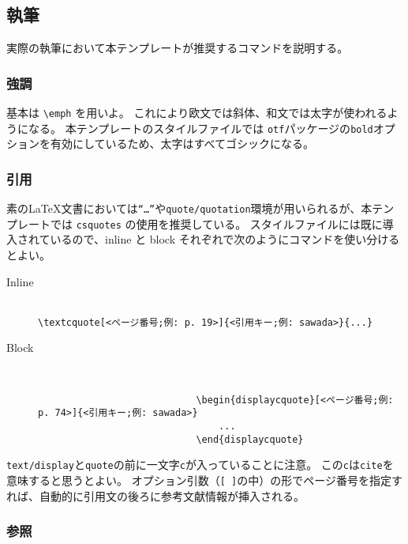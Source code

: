 		\subsection{執筆}
			\label{sub:writing}

			実際の執筆において本テンプレートが推奨するコマンドを説明する。

			\subsubsection{強調}

				基本は \texttt{\textbackslash emph} を用いよ。
				これにより欧文では斜体、和文では太字が使われるようになる。
				本テンプレートのスタイルファイルでは \texttt{otf}パッケージの\texttt{bold}オプションを有効にしているため、太字はすべてゴシックになる。

			\subsubsection{引用}

				素の\LaTeX 文書においては\texttt{``\dots''}や\texttt{quote/quotation}環境が用いられるが、本テンプレートでは \texttt{csquotes} の使用を推奨している。
				スタイルファイルには既に導入されているので、inline と block それぞれで次のようにコマンドを使い分けるとよい。

				\begin{description}
					\item[Inline] 　\\
						\verb|\textcquote[<ページ番号;例: p. 19>]{<引用キー;例: sawada>}{...}|
					\item[Block] 　
						\begin{verbatim}
							\begin{displaycquote}[<ページ番号;例: p. 74>]{<引用キー;例: sawada>}
							    ...
							\end{displaycquote}
						\end{verbatim}
				\end{description}

				\noindent
				\texttt{text/display}と\texttt{quote}の前に一文字\texttt{c}が入っていることに注意。
				この\texttt{c}は\texttt{cite}を意味すると思うとよい。
				オプション引数（\texttt{[ ]}の中）の形でページ番号を指定すれば、自動的に引用文の後ろに参考文献情報が挿入される。

			\subsubsection{参照}

